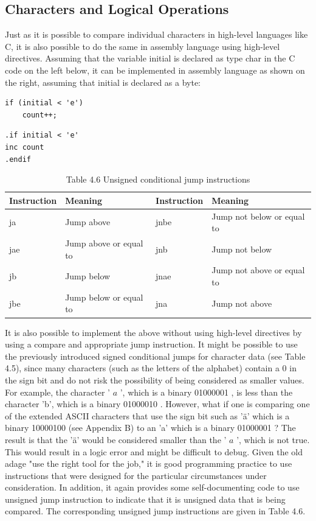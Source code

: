 \documentclass[10pt]{article}
\begin{document}
\subsection*{Characters and Logical Operations}
Just as it is possible to compare individual characters in high-level languages like C, it is also possible to do the same in assembly language using high-level directives. Assuming that the variable initial is declared as type char in the C code on the left below, it can be implemented in assembly language as shown on the right, assuming that initial is declared as a byte:

\begin{verbatim}
if (initial < 'e')
    count++;
\end{verbatim}

\begin{verbatim}
.if initial < 'e'
inc count
.endif
\end{verbatim}

\begin{table}[h]
\begin{center}
\captionsetup{labelformat=empty}
\caption{Table 4.6 Unsigned conditional jump instructions}
\begin{tabular}{|l|l|l|l|}
\hline
Instruction & Meaning & Instruction & Meaning \\
\hline
ja & Jump above & jnbe & Jump not below or equal to \\
\hline
jae & Jump above or equal to & jnb & Jump not below \\
\hline
jb & Jump below & jnae & Jump not above or equal to \\
\hline
jbe & Jump below or equal to & jna & Jump not above \\
\hline
\end{tabular}
\end{center}
\end{table}

It is also possible to implement the above without using high-level directives by using a compare and appropriate jump instruction. It might be possible to use the previously introduced signed conditional jumps for character data (see Table 4.5), since many characters (such as the letters of the alphabet) contain a 0 in the sign bit and do not risk the possibility of being considered as smaller values. For example, the character ' $a$ ', which is a binary 01000001 , is less than the character 'b', which is a binary 01000010 . However, what if one is comparing one of the extended ASCII characters that use the sign bit such as 'ä' which is a binary 10000100 (see Appendix B) to an 'a' which is a binary 01000001 ? The result is that the 'ä' would be considered smaller than the ' $a$ ', which is not true. This would result in a logic error and might be difficult to debug. Given the old adage "use the right tool for the job," it is good programming practice to use instructions that were designed for the particular circumstances under consideration. In addition, it again provides some self-documenting code to use unsigned jump instruction to indicate that it is unsigned data that is being compared. The corresponding unsigned jump instructions are given in Table 4.6.
\end{document}
